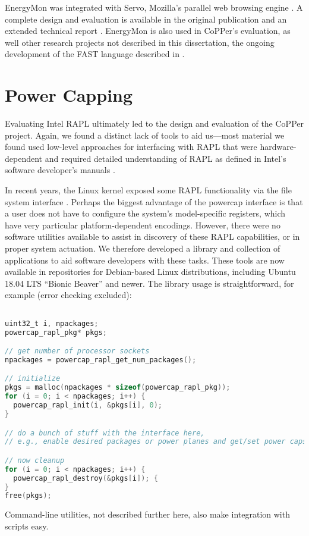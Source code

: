 EnergyMon was integrated with Servo, Mozilla's parallel web browsing engine \cite{servo}.
A complete design and evaluation is available in the original publication \cite{energymon} and an extended technical report \cite{EnergyMonTR}.
EnergyMon is also used in CoPPer's evaluation, as well other research projects not described in this dissertation, \eg the ongoing development of the FAST language described in .


\section{Power Capping}
\label{app:powercap}

Evaluating Intel RAPL \cite{RAPL} ultimately led to the design and evaluation of the CoPPer project.
Again, we found a distinct lack of tools to aid us---most material we found used low-level approaches for interfacing with RAPL that were hardware-dependent and required detailed understanding of RAPL as defined in Intel's software developer's manuals \cite{intel-sdm}.

In recent years, the Linux kernel exposed some RAPL functionality via the  file system interface \cite{powercap}.
Perhaps the biggest advantage of the powercap interface is that a user does not have to configure the system's model-specific registers, which have very particular platform-dependent encodings.
However, there were no software utilities available to assist in discovery of these RAPL capabilities, or in proper system actuation.
We therefore developed a  library and collection of applications to aid software developers with these tasks.
These tools are now available in repositories for Debian-based Linux distributions, including Ubuntu 18.04 LTS ``Bionic Beaver'' and newer.
The library usage is straightforward, for example (error checking excluded):
%
\begin{lstlisting}[language=C,%
  caption={Basic lifecycle of the powercap library.},%
  morekeywords={uint32_t},%
  label={lst:powercap-example}]%

uint32_t i, npackages;
powercap_rapl_pkg* pkgs;

// get number of processor sockets
npackages = powercap_rapl_get_num_packages();

// initialize
pkgs = malloc(npackages * sizeof(powercap_rapl_pkg));
for (i = 0; i < npackages; i++) {
  powercap_rapl_init(i, &pkgs[i], 0);
}

// do a bunch of stuff with the interface here,
// e.g., enable desired packages or power planes and get/set power caps...

// now cleanup
for (i = 0; i < npackages; i++) {
  powercap_rapl_destroy(&pkgs[i]); {
}
free(pkgs);
\end{lstlisting}
Command-line utilities, not described further here, also make integration with scripts easy.


